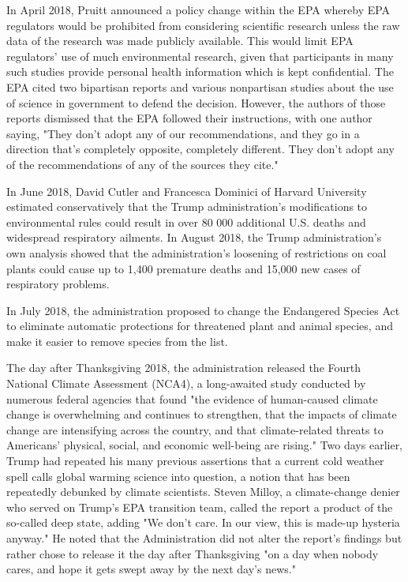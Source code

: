 In April 2018, Pruitt announced a policy change within the EPA whereby
EPA regulators would be prohibited from considering scientific research
unless the raw data of the research was made publicly available. This
would limit EPA regulators' use of much environmental research, given
that participants in many such studies provide personal health
information which is kept confidential. The EPA cited two bipartisan
reports and various nonpartisan studies about the use of science in
government to defend the decision. However, the authors of those reports
dismissed that the EPA followed their instructions, with one author
saying, "They don't adopt any of our recommendations, and they go in a
direction that's completely opposite, completely different. They don't
adopt any of the recommendations of any of the sources they cite."

In June 2018, David Cutler and Francesca Dominici of Harvard University
estimated conservatively that the Trump administration's modifications
to environmental rules could result in over 80 000 additional U.S.
deaths and widespread respiratory ailments. In August 2018, the Trump
administration's own analysis showed that the administration's loosening
of restrictions on coal plants could cause up to 1,400 premature deaths
and 15,000 new cases of respiratory problems.

In July 2018, the administration proposed to change the Endangered
Species Act to eliminate automatic protections for threatened plant and
animal species, and make it easier to remove species from the list.

The day after Thanksgiving 2018, the administration released the Fourth
National Climate Assessment (NCA4), a long-awaited study conducted by
numerous federal agencies that found "the evidence of human-caused
climate change is overwhelming and continues to strengthen, that the
impacts of climate change are intensifying across the country, and that
climate-related threats to Americans' physical, social, and economic
well-being are rising." Two days earlier, Trump had repeated his many
previous assertions that a current cold weather spell calls global
warming science into question, a notion that has been repeatedly
debunked by climate scientists. Steven Milloy, a climate-change denier
who served on Trump's EPA transition team, called the report a product
of the so-called deep state, adding "We don't care. In our view, this is
made-up hysteria anyway." He noted that the Administration did not alter
the report's findings but rather chose to release it the day after
Thanksgiving "on a day when nobody cares, and hope it gets swept away by
the next day's news."

